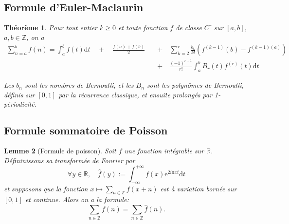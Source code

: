 \documentclass[french]{report}
\newtheorem{theorem}{Théorème}[section]
\newtheorem{lemma}[theorem]{Lemme}
\begin{document}
\subsection{Formule d'Euler-Maclaurin}

\begin{theorem}\label{eq:euler-maclaurin}
  Pour tout entier $k\geq0$ et toute fonction $f$ de classe $C^r$ sur $[a,b]$, $a,b\in\mathbb{Z}$, on a
  \begin{align*}
    \sum_{n=a}^b f(n) = \int_a^b f(t)\mathrm{d}t \quad + \quad \frac{f(a) + f(b)}{2} \quad &+ \quad \sum_{k=2}^r\frac{b_{k}}{k!}(f^{(k-1)}(b) - f^{(k-1)(a)}) \\
    &+ \quad \frac{(-1)^{r+1}}{r!}\int_a^b B_r(t)f^{(r)}(t)\mathrm{d}t
  \end{align*}

  Les $b_n$ sont les nombres de Bernoulli, et les $B_n$ sont les polynômes de Bernoulli, définis sur $[0,1]$ par la récurrence classique, et ensuite prolongés par 1-périodicité.
\end{theorem}

\subsection{Formule sommatoire de Poisson}

\begin{lemma}[Formule de poisson]\label{lem:formule-poisson}
  Soit $f$ une fonction intégrable sur $\mathbb{R}$. Défininissons sa transformée de Fourier par
  \[
    \forall y\in\mathbb{R},\quad\hat{f}(y):=\int_{-\infty}^{+\infty}f(x)\mathrm{e}^{2i\pi xt}\mathrm{d}t
  \]
  et supposons que la fonction $x\mapsto\sum_{n\in\mathbb{Z}}f(x+n)$ est à variation bornée sur $[0,1]$ et continue. Alors on a la formule:
  \[
    \sum_{n\in\mathbb{Z}}f(n)=\sum_{n\in\mathbb{Z}}\hat{f}(n).
  \]
\end{lemma}
\end{document}
